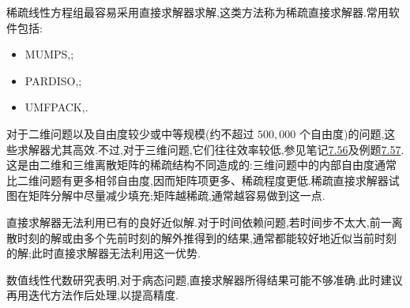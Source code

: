 \begin{note}[稀疏直接求解器]
\label{note:chapter9-solver-choice}\label{note:umfpack}\label{note:ch09-sparse-direct-solvers}
稀疏线性方程组最容易采用直接求解器求解,这类方法称为稀疏直接求解器.常用软件包括:
\begin{itemize}
  \item MUMPS,\textcite{Amestoy2001,Amestoy2006};
  \item PARDISO,\textcite{Schenk2008};
  \item UMFPACK,\textcite{Davis2004}.
\end{itemize}
对于二维问题以及自由度较少或中等规模(约不超过 $500{,}000$ 个自由度)的问题,这些求解器尤其高效.不过,对于三维问题,它们往往效率较低,参见笔记\hyperref[note:time-dependent-picard-newton-comparison]{7.56}及例题\hyperref[ex:time-dependent-picard-vs-newton]{7.57}.这是由二维和三维离散矩阵的稀疏结构不同造成的:三维问题中的内部自由度通常比二维问题有更多相邻自由度,因而矩阵项更多、稀疏程度更低.稀疏直接求解器试图在矩阵分解中尽量减少填充;矩阵越稀疏,通常越容易做到这一点.

直接求解器无法利用已有的良好近似解.对于时间依赖问题,若时间步不太大,前一离散时刻的解或由多个先前时刻的解外推得到的结果,通常都能较好地近似当前时刻的解;此时直接求解器无法利用这一优势.

数值线性代数研究表明,对于病态问题,直接求解器所得结果可能不够准确.此时建议再用迭代方法作后处理,以提高精度.
\end{note}

